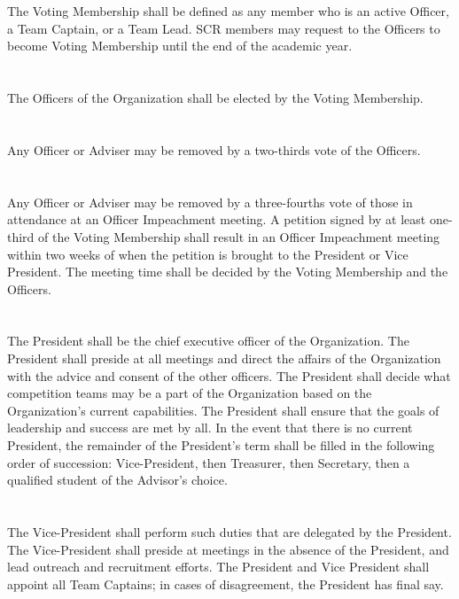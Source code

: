 \documentclass[12pt]{cls/constitution}
\begin{document}
\section{}
The Voting Membership shall be defined as any member who is an active Officer, a Team Captain, or a Team Lead. SCR members may request to the Officers to become Voting Membership until the end of the academic year.

\section{}
The Officers of the Organization shall be elected by the Voting Membership.

\section{}
Any Officer or Adviser may be removed by a two-thirds vote of the Officers.

\section{}
Any Officer or Adviser may be removed by a three-fourths vote of those in attendance at an Officer Impeachment meeting. A petition signed by at least one-third of the Voting Membership shall result in an Officer Impeachment meeting within two weeks of when the petition is brought to the President or Vice President. The meeting time shall be decided by the Voting Membership and the Officers.

\section{}
The President shall be the chief executive officer of the Organization. The President shall preside at all meetings and direct the affairs of the Organization with the advice and consent of the other officers. The President shall decide what competition teams may be a part of the Organization based on the Organization’s current capabilities. The President shall ensure that the goals of leadership and success are met by all. In the event that there is no current President, the remainder of the President’s term shall be filled in the following order of succession:  Vice-President, then Treasurer, then Secretary, then a qualified student of the Advisor’s choice.

\section{}
The Vice-President shall perform such duties that are delegated by the President. The Vice-President shall preside at meetings in the absence of the President, and lead outreach and recruitment efforts. 
The President and Vice President shall appoint all Team Captains; in cases of disagreement, the President has final say. 
\end{document}

